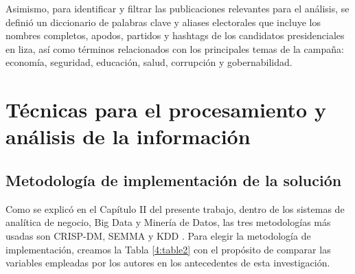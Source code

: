 \documentclass[listof=nochaptergap,12pt,times,authoryear]{report}
\begin{document}
Asimismo, para identificar y filtrar las publicaciones relevantes para el análisis, se
definió un diccionario de palabras clave y aliases electorales que incluye los nombres
completos, apodos, partidos y hashtags de los candidatos presidenciales en liza, así como
términos relacionados con los principales temas de la campaña: economía, seguridad,
educación, salud, corrupción y gobernabilidad.
 
\section{Técnicas para el procesamiento y análisis de la información}
 
\subsection{Metodología de implementación de la solución}
 
Como se explicó en el Capítulo II del presente trabajo, dentro de los sistemas de
analítica de negocio, Big Data y Minería de Datos, las tres metodologías más usadas son
CRISP-DM, SEMMA y KDD \parencite{tec_braulio2015metodologiasdm}. Para elegir la
metodología de implementación, creamos la Tabla \ref{4:table2} con el propósito de comparar las variables empleadas por los autores en los antecedentes de esta investigación.
 
\end{document}
